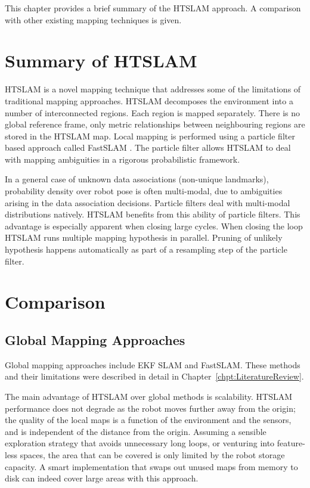 This chapter provides a brief summary of the HTSLAM approach. A comparison
with other existing mapping techniques is given. 


\section{Summary of HTSLAM}

HTSLAM is a novel mapping technique that addresses some of the
limitations of traditional mapping approaches. HTSLAM decomposes the
environment into a number of interconnected regions. Each region is
mapped separately. There is no global reference frame, only
metric relationships between neighbouring regions are stored in the
HTSLAM map. Local mapping is performed using a particle filter based
approach called FastSLAM \cite{fastslam, fastslam2}. The particle filter
allows HTSLAM to deal with mapping ambiguities in a rigorous
probabilistic framework.


In a general case of unknown data associations (non-unique landmarks),
probability density over robot pose is often multi-modal, due to
ambiguities arising in the data association decisions. Particle filters
deal with multi-modal distributions natively. HTSLAM benefits from this
ability of particle filters. This advantage is especially apparent when
closing large cycles. When closing the loop HTSLAM runs multiple mapping
hypothesis in parallel. Pruning of unlikely hypothesis happens
automatically as part of a resampling step of the particle filter.



\section{Comparison}

\subsection{Global Mapping Approaches}

Global mapping approaches include EKF SLAM and FastSLAM. These methods
and their limitations were described in detail in
Chapter~\ref{chpt:LiteratureReview}.

The main advantage of HTSLAM over global methods is scalability. HTSLAM
performance does not degrade as the robot moves further away from the
origin; the quality of the local maps is a function of the environment
and the sensors, and is independent of the distance from the
origin. Assuming a sensible exploration strategy that avoids unnecessary
long loops, or venturing into feature-less spaces, the area that can be
covered is only limited by the robot storage capacity. A smart
implementation that swaps out unused maps from memory to disk can indeed
cover large areas with this approach.


